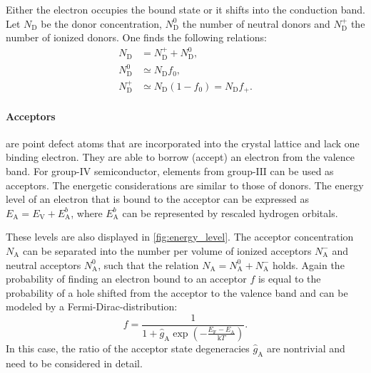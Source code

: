 Either the electron occupies the bound state or it shifts into the
conduction band.
Let $N_\mathrm{D}$ be the donor concentration, $N_\mathrm{D}^0$ the
number of neutral donors and $N_\mathrm{D}^+$ the number of ionized donors.
One finds the following relations:
\begin{align}
	N_{\mathrm{D}}     & =N_{\mathrm{D}}^{+}+N_{\mathrm{D}}^{0},\\
	N_{\mathrm{D}}^{0} & \simeq N_{\mathrm{D}}f_0, \\
	\label{eq:ndplus}
	N_{\mathrm{D}}^{+} & \simeq N_{\mathrm{D}}(1-f_{0}) =N_{\mathrm{D}}f_{+}.
\end{align}

\paragraph{Acceptors} are point defect atoms that are incorporated
into the crystal
lattice and lack one binding electron.
They are able to borrow (accept) an electron from the valence band.
For group-$\mathrm{IV}$ semiconductor, elements from group-$\mathrm{III}$
can be used as acceptors.
The energetic considerations are similar to those of donors.
The energy level of an electron that is bound to the acceptor can be
expressed as
$E_{\mathrm{A}}=E_{\mathrm{V}}+E_{\mathrm{A}}^{b}$,
where $E_\mathrm{A}^b$ can be represented by rescaled
hydrogen orbitals.

These levels are also displayed in \cref{fig:energy_level}.
The acceptor concentration $N_\mathrm{A}$ can be separated into
the number per volume of ionized acceptors $N_\mathrm{A}^-$ and neutral
acceptors $N_\mathrm{A}^0$, such that the relation
$N_{\mathrm{A}}=N_{\mathrm{A}}^{0}+N_{\mathrm{A}}^{-}$ holds.
Again the probability of finding an electron bound to an acceptor $f$ is
equal to the probability of a hole shifted from the acceptor to the
valence band and can be modeled by a Fermi-Dirac-distribution:
\begin{equation}
	f = \frac{1}{1+\hat{g}_{\mathrm{A}}\exp\left( -
	\frac{E_{\mathrm{F}}-E_{\mathrm{A}}}{\mathrm{k}T} \right)}.
\end{equation}
In this case, the ratio of the acceptor state degeneracies
$\hat{g}_\mathrm{A}$ are nontrivial and need to be considered in detail.

